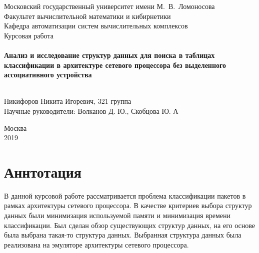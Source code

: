 \documentclass[a4peper, 12pt, titlepage, finall]{report}
\begin{document}
    \begin{titlepage}
        \begin{center}
            {\small \sc Московский государственный университет имени М.~В.~Ломоносова\\
            Факультет вычислительной математики и кибирнетики\\
            Кафедра автоматизации систем вычислительных комплексов\\}
            \vfill
            {\large \sc Курсовая работа}\\~\\

            {\large \bf Анализ и исследование структур данных для поиска в таблицах классификации в архитектуре сетевого процессора без выделенного ассоциативного устройства}\\~\\

        \end{center}
        
        \begin{flushright}
            \vfill
            \vfill
            {Никифоров Никита Игоревич, 321 группа}\\
            {Научные руководители: Волканов Д. Ю., Скобцова Ю. А}
        \end{flushright}

        \begin{center}
            \vfill
            {\small Москва\\2019}
        \end{center}
    \end{titlepage}

    \chapter*{Аннтотация}
        В данной курсовой работе рассматривается проблема классификации пакетов в рамках архитектуры сетевого процессора. В качестве критериев выбора структур данных были минимизация 
        используемой памяти и минимизация времени классификации. Был сделан обзор существующих структур данных, на его основе была выбрана {\ttfamily такая-то} 
        структура данных. Выбранная структура данных была реализована на эмуляторе архитектуры сетевого процессора.
        
    \newpage
    \tableofcontents
    \newpage
\end{document}
